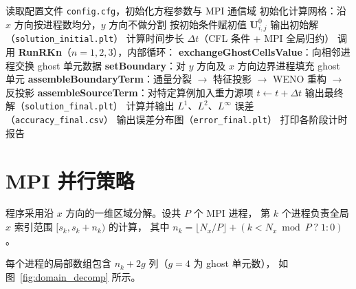 \documentclass{article}
\numberwithin{equation}{section}
\begin{document}
\begin{algorithm}[H]
\caption{FD-WENO-EulerEquation 主计算流程}
\begin{algorithmic}[1]
\State 读取配置文件 \texttt{config.cfg}，初始化方程参数与 MPI 通信域
\State 初始化计算网格：沿 $x$ 方向按进程数均分，$y$ 方向不做分割
\State 按初始条件赋初值 $\mathbf{U}^0_{i,j}$
\State 输出初始解（\texttt{solution\_initial.plt}）
    \State 计算时间步长 $\Delta t$（CFL 条件 + MPI 全局归约）
    \State 调用 \textbf{RunRKn}（$n=1,2,3$），内部循环：
    \State \quad \textbf{exchangeGhostCellsValue}：向相邻进程交换 ghost 单元数据
    \State \quad \textbf{setBoundary}：对 $y$ 方向及 $x$ 方向边界进程填充 ghost 单元
    \State \quad \textbf{assembleBoundaryTerm}：通量分裂 $\to$ 特征投影 $\to$ WENO 重构 $\to$ 反投影
    \State \quad \textbf{assembleSourceTerm}：对特定算例加入重力源项
    \State $t \leftarrow t + \Delta t$
\EndWhile
\State 输出最终解（\texttt{solution\_final.plt}）
    \State 计算并输出 $L^1$、$L^2$、$L^\infty$ 误差（\texttt{accuracy\_final.csv}）
    \State 输出误差分布图（\texttt{error\_final.plt}）
\EndIf
\State 打印各阶段计时报告
\end{algorithmic}
\end{algorithm}

\section{MPI 并行策略}

程序采用沿 $x$ 方向的一维区域分解。设共 $P$ 个 MPI 进程，
第 $k$ 个进程负责全局 $x$ 索引范围 $[s_k, s_k + n_k)$ 的计算，
其中 $n_k = \lfloor N_x/P \rfloor + (k < N_x \bmod P \;?\; 1 : 0)$。

每个进程的局部数组包含 $n_k + 2g$ 列（$g=4$ 为 ghost 单元数），
如图~\ref{fig:domain_decomp} 所示。
\end{document}
